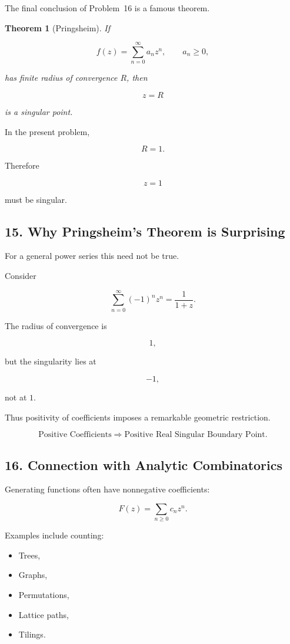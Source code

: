 \documentclass[12pt,a4paper]{article}
\newtheorem{theorem}{Theorem}[section]
\theoremstyle{notespace}
\begin{document}
The final conclusion of Problem~16 is a famous theorem.

\begin{theorem}[Pringsheim]
	If
	
	\[
	f(z)
	=
	\sum_{n=0}^{\infty}
	a_n z^n,
	\qquad
	a_n\ge0,
	\]
	
	has finite radius of convergence \(R\), then
	
	\[
	z=R
	\]
	
	is a singular point.
\end{theorem}

In the present problem,

\[
R=1.
\]

Therefore

\[
z=1
\]

must be singular.

\bigskip

\subsection{15. Why Pringsheim's Theorem is Surprising}

For a general power series this need not be true.

Consider

\[
\sum_{n=0}^{\infty}
(-1)^n z^n
=
\frac1{1+z}.
\]

The radius of convergence is

\[
1,
\]

but the singularity lies at

\[
-1,
\]

not at \(1\).

Thus positivity of coefficients imposes a remarkable geometric restriction.

\[
\boxed{
	\text{Positive Coefficients}
	\Longrightarrow
	\text{Positive Real Singular Boundary Point}.
}
\]

\bigskip

\subsection{16. Connection with Analytic Combinatorics}

Generating functions often have nonnegative coefficients:

\[
F(z)
=
\sum_{n\ge0}
c_n z^n.
\]

Examples include counting:

\begin{itemize}
	\item Trees,
	\item Graphs,
	\item Permutations,
	\item Lattice paths,
	\item Tilings.
\end{itemize}
\end{document}
